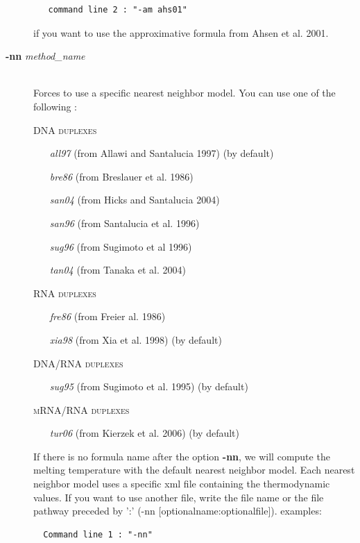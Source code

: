 \documentclass{article}
\begin{document}
\begin{description}
  \begin{verbatim}
   command line 2 : "-am ahs01" 
  \end{verbatim}
  	  
  if you want to use the approximative formula from 
  Ahsen et al. 2001.
    	
\item [\textbf{-nn} \textit{method\_name}]\mbox{}\\ 
  Forces to use a specific nearest neighbor model. You can use one of the following :
  
  \textsc{DNA duplexes}
    \begin{itemize}
    \item [\textit{all97}] (from Allawi and Santalucia 1997)  (by default)
    \item [\textit{bre86}] (from Breslauer et al. 1986)
    \item [\textit{san04}] (from Hicks and Santalucia 2004)
    \item [\textit{san96}] (from Santalucia et al. 1996)
    \item [\textit{sug96}] (from Sugimoto et al 1996)
    \item [\textit{tan04}] (from Tanaka et al. 2004)		 
    \end{itemize}
  \textsc{RNA duplexes}
    \begin{itemize}
    \item [\textit{fre86}] (from Freier al. 1986)
    \item [\textit{xia98}] (from Xia et al. 1998)  (by default)		 
    \end{itemize}
  \textsc{DNA/RNA duplexes}
    \begin{itemize}
    \item [\textit{sug95}] (from Sugimoto et al. 1995)  (by default)
    \end{itemize}
  \textsc{mRNA/RNA duplexes}
    \begin{itemize}
    \item [\textit{tur06}] (from Kierzek et al. 2006)  (by default)
    \end{itemize}
  If there is no formula name after the option \textbf{-nn}, we will compute the melting temperature with the default nearest neighbor model. 
  Each nearest neighbor model uses a specific xml file containing the thermodynamic values. If you want to use another file, write the file name or the file pathway preceded by ':' (-nn [optionalname:optionalfile]).
  examples:
     
  \begin{verbatim}
  Command line 1 : "-nn" 
  

\end{verbatim}
\end{description}
\end{document}
